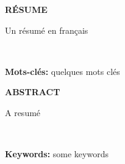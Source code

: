 
\thispagestyle{empty}

\vfill

\begin{center}
	\LARGE{\textbf{RÉSUME}}\\[1.0cm]
\end{center}



\large{
Un résumé en français
}

~~

\textbf{Mots-clés: } quelques mots clés

\vfill


\begin{center}
	\LARGE{\textbf{ABSTRACT}}\\[1.0cm]
\end{center}


\large{
A resumé
}

~~

\textbf{Keywords: } some keywords

\vfill
